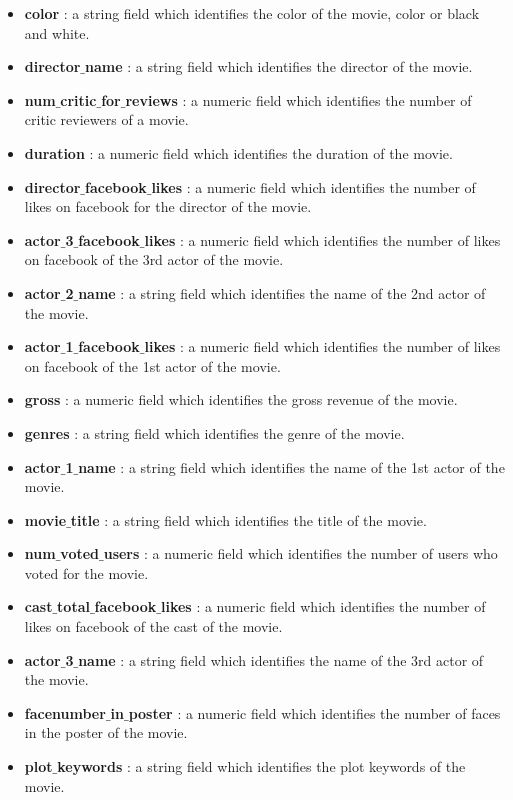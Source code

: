 \documentclass[conference]{IEEEtran}
\begin{document}
\begin{itemize}
	\item \textbf{color} : a string field which identifies the color of the movie, color or black and white.
	\item \textbf{director$\_$name} : a string field which identifies the director of the movie.
	\item \textbf{num$\_$critic$\_$for$\_$reviews} : a numeric field which identifies the number of critic reviewers of a movie.
	\item \textbf{duration} : a numeric field which identifies the duration of the movie.
	\item \textbf{director$\_$facebook$\_$likes} : a numeric field which identifies the number of likes on facebook for the director of the movie.
	\item \textbf{actor$\_$3$\_$facebook$\_$likes} : a numeric field which identifies the number of likes on facebook of the 3rd actor of the movie.
	\item \textbf{actor$\_$2$\_$name} : a string field which identifies the name of the 2nd actor of the movie.
	\item \textbf{actor$\_$1$\_$facebook$\_$likes} : a numeric field which identifies the number of likes on facebook of the 1st actor of the movie.
	\item \textbf{gross} : a numeric field which identifies the gross revenue of the movie. 
	\item \textbf{genres}  : a string field which identifies the genre of the movie. 
	\item \textbf{actor$\_$1$\_$name} : a string field which identifies the name of the 1st actor of the movie.
	\item \textbf{movie$\_$title} : a string field which identifies the title of the movie.
	\item \textbf{num$\_$voted$\_$users} : a numeric field which identifies the number of users who voted for the movie. 
	\item \textbf{cast$\_$total$\_$facebook$\_$likes} : a numeric field which identifies the number of likes on facebook of the cast of the movie.
	\item \textbf{actor$\_$3$\_$name} : a string field which identifies the name of the 3rd actor of the movie.
	\item \textbf{facenumber$\_$in$\_$poster} : a numeric field which identifies the number of faces in the poster of the movie.
	\item \textbf{plot$\_$keywords}  : a string field which identifies the plot keywords of the movie.

\end{itemize}
\end{document}
